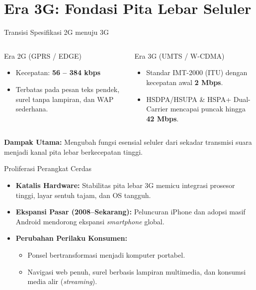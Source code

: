 \documentclass[10pt,aspectratio=169]{beamer}
\begin{document}
\section{Era 3G: Fondasi Pita Lebar Seluler}

\begin{frame}{Transisi Spesifikasi 2G menuju 3G}
  \begin{columns}[T,onlytextwidth]
      \begin{block}{Era 2G (GPRS / EDGE)}
        \begin{itemize}
          \item Kecepatan: \textbf{56 -- 384 kbps}
          \item Terbatas pada pesan teks pendek, surel tanpa lampiran, dan WAP sederhana.
        \end{itemize}
      \end{block}

      \begin{block}{Era 3G (UMTS / W-CDMA)}
        \begin{itemize}
          \item Standar IMT-2000 (ITU) dengan kecepatan awal \textbf{2 Mbps}.
          \item HSDPA/HSUPA \& HSPA+ Dual-Carrier mencapai puncak hingga \textbf{42 Mbps}.
        \end{itemize}
      \end{block}
  \end{columns}

  \vspace{0.8em}
  \textbf{Dampak Utama:} Mengubah fungsi esensial seluler dari sekadar transmisi suara menjadi kanal pita lebar berkecepatan tinggi.
\end{frame}

\begin{frame}{Proliferasi Perangkat Cerdas}
  \begin{itemize}
    \item \textbf{Katalis Hardware:} Stabilitas pita lebar 3G memicu integrasi prosesor tinggi, layar sentuh tajam, dan OS tangguh.
    \item \textbf{Ekspansi Pasar (2008--Sekarang):} Peluncuran iPhone dan adopsi masif Android mendorong ekspansi \textit{smartphone} global.
    \item \textbf{Perubahan Perilaku Konsumen:}
      \begin{itemize}
        \item Ponsel bertransformasi menjadi komputer portabel.
        \item Navigasi web penuh, surel berbasis lampiran multimedia, dan konsumsi media alir (\textit{streaming}).
      \end{itemize}
  \end{itemize}
\end{frame}
\end{document}
